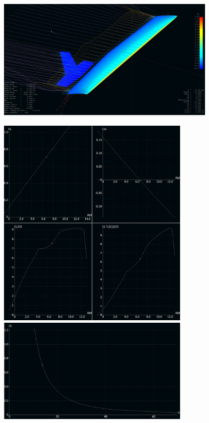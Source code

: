 \documentclass[]{auvsi_doc}
\begin{document}
\begin{center}
	\includegraphics[width=0.80\textwidth]{./figs/awesomeMeaninglessRendering.png}
	\label{rendering}
\end{center}

\begin{center}
	\includegraphics[width=0.70\textwidth]{./figs/LiftDragPolars.png}
	\includegraphics[width=0.70\textwidth]{./figs/CLvV.png}
	\label{planePolars}
\end{center}
\end{document}
